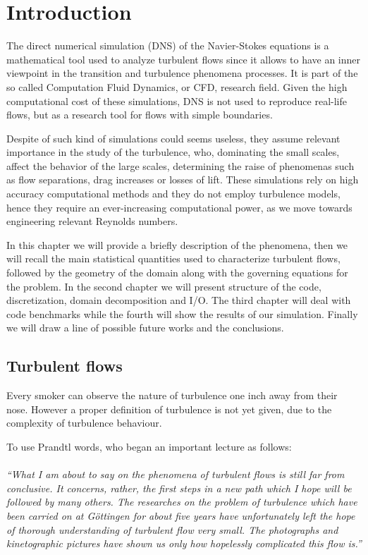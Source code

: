 \chapter{Introduction}
The direct numerical simulation (DNS) of the Navier-Stokes equations is a mathematical tool used to analyze turbulent flows since it allows to have an inner viewpoint in the transition and turbulence phenomena processes. It is part of the so called Computation Fluid Dynamics, or CFD, research field. 
Given the high computational cost of these simulations, DNS is not used to reproduce real-life flows, but as a research tool for flows with simple boundaries\cite{dns:tool}. \par
Despite of such kind of simulations could seems useless, they assume relevant importance in the study of the turbulence, who, dominating the small scales, affect the behavior of the large scales, determining the raise of phenomenas such as flow separations, drag increases or losses of lift.
These simulations rely on high accuracy computational methods and they do not employ turbulence models, hence they require an ever-increasing computational power, as we move towards engineering relevant Reynolds numbers.
\par
In this chapter we will provide a briefly description of the phenomena, then we will recall the main statistical quantities used to characterize turbulent flows, followed by the geometry of the domain along with the governing equations for the problem. In the second chapter we will present structure of the code, discretization, domain decomposition and I/O.
The third chapter will deal with code benchmarks while the fourth will show the results of our simulation. Finally we will draw a line of possible future works and the conclusions.

\section{Turbulent flows}
Every smoker can observe the nature of turbulence one inch away from their nose.
However a proper definition of turbulence is not yet given, due to the complexity of turbulence behaviour. \par
To use Prandtl words, who began an important lecture as follows: \\~\\
\emph{``What I am about to say on the phenomena of turbulent flows is still far from conclusive. It concerns, rather, the first steps in a new path which I hope will be followed by many others. The researches on the problem of turbulence which have been carried on at G\"{o}ttingen for about five years have unfortunately left the hope of thorough understanding of turbulent flow very small. The photographs and kinetographic pictures have shown us only how hopelessly complicated this flow is.''} \\~\\

